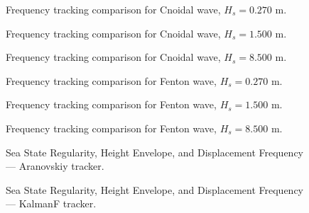 \documentclass[11pt,letterpaper]{article}
\begin{document}
\begin{figure}[H]\centering
  \resizebox{\textwidth}{!}{}
  \caption{Frequency tracking comparison for Cnoidal wave, $H_s = 0.270$ m.}
  \label{fig:freqtrack_cnoidal_low}
\end{figure}

\begin{figure}[H]\centering
  \resizebox{\textwidth}{!}{}
  \caption{Frequency tracking comparison for Cnoidal wave, $H_s = 1.500$ m.}
  \label{fig:freqtrack_cnoidal_medium}
\end{figure}

\begin{figure}[H]\centering
  \resizebox{\textwidth}{!}{}
  \caption{Frequency tracking comparison for Cnoidal wave, $H_s = 8.500$ m.}
  \label{fig:freqtrack_cnoidal_high}
\end{figure}

\begin{figure}[H]\centering
  \resizebox{\textwidth}{!}{}
  \caption{Frequency tracking comparison for Fenton wave, $H_s = 0.270$ m.}
  \label{fig:freqtrack_fenton_low}
\end{figure}

\begin{figure}[H]\centering
  \resizebox{\textwidth}{!}{}
  \caption{Frequency tracking comparison for Fenton wave, $H_s = 1.500$ m.}
  \label{fig:freqtrack_fenton_medium}
\end{figure}

\begin{figure}[H]\centering
  \resizebox{\textwidth}{!}{}
  \caption{Frequency tracking comparison for Fenton wave, $H_s = 8.500$ m.}
  \label{fig:freqtrack_fenton_high}
\end{figure}


\begin{figure}[H]\centering
  \resizebox{\textwidth}{!}{}
  \caption{Sea State Regularity, Height Envelope, and Displacement Frequency — Aranovskiy tracker.}
  \label{fig:seareg_aranovskiy}
\end{figure}

\begin{figure}[H]\centering
  \resizebox{\textwidth}{!}{}
  \caption{Sea State Regularity, Height Envelope, and Displacement Frequency — KalmanF tracker.}
  \label{fig:seareg_kalmanf}
\end{figure}
\end{document}

